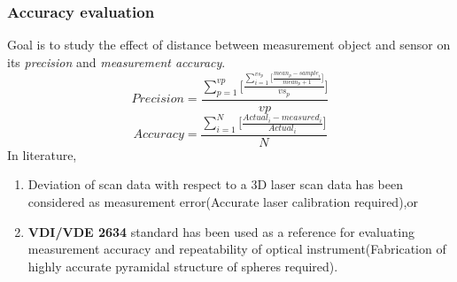 \documentclass[9pt]{beamer}
\begin{document}

\begin{frame}
\frametitle{Accuracy evaluation}
Goal is to study the effect of distance between measurement object and sensor on its \textit{precision} and \textit{measurement accuracy}.
\begin{equation}
Precision=\frac{\sum_{p=1}^{vp}\Big[\frac{\sum_{i=1}^{vs_{p}}\Big[\frac{mean_{p}-sample_{i}}{mean_{p}+1}\Big]}{vs_{p}}\Big]}{vp}
\end{equation}
\noindent
\begin{equation}
Accuracy=\frac{\sum_{i=1}^{N}\Big[\frac{Actual_{i}-measured_{i}}{Actual_{i}}\Big]}{N}
\end{equation}
In literature,
\begin{enumerate}
\item Deviation of scan data with respect to a 3D laser scan data has been considered as measurement error(Accurate laser calibration required),or
\item \textbf{VDI/VDE 2634} standard has been used as a reference for evaluating measurement accuracy and repeatability of optical instrument(Fabrication of highly accurate pyramidal structure of spheres required).
\end{enumerate}
\end{frame}
\end{document}
